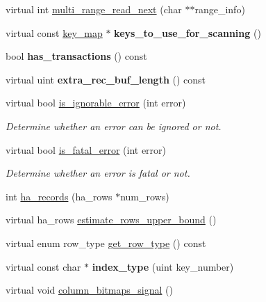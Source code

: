 \begin{DoxyCompactItemize}
\item 
virtual int \mbox{\hyperlink{classhandler_a3419071f3d4abf183dac95ef565adfff}{multi\+\_\+range\+\_\+read\+\_\+next}} (char $\ast$$\ast$range\+\_\+info)
\item 
\mbox{\label{classhandler_a29c43b5f1fb4c515d2c5842dcbc24fac}} 
virtual const \mbox{\hyperlink{classBitmap_3_0164_01_4}{key\+\_\+map}} $\ast$ {\bfseries keys\+\_\+to\+\_\+use\+\_\+for\+\_\+scanning} ()
\item 
\mbox{\label{classhandler_a08686bccb46c2be2cc92ff2f75ab9540}} 
bool {\bfseries has\+\_\+transactions} () const
\item 
\mbox{\label{classhandler_a27fd434bc44b88f4e47f44f02c877c91}} 
virtual uint {\bfseries extra\+\_\+rec\+\_\+buf\+\_\+length} () const
\item 
virtual bool \mbox{\hyperlink{classhandler_a39c5919d6a3f3098353f4517e2c81037}{is\+\_\+ignorable\+\_\+error}} (int error)
\begin{DoxyCompactList}\small\item\em Determine whether an error can be ignored or not. \end{DoxyCompactList}\item 
virtual bool \mbox{\hyperlink{classhandler_a37413b5d60b340ffe26a6713b65bab75}{is\+\_\+fatal\+\_\+error}} (int error)
\begin{DoxyCompactList}\small\item\em Determine whether an error is fatal or not. \end{DoxyCompactList}\item 
int \mbox{\hyperlink{classhandler_a9fe4a9e78c818aa2823c302f0fe65522}{ha\+\_\+records}} (ha\+\_\+rows $\ast$num\+\_\+rows)
\item 
virtual ha\+\_\+rows \mbox{\hyperlink{classhandler_ae59e9a1d36d852f4dd5dd00bff5f1ae4}{estimate\+\_\+rows\+\_\+upper\+\_\+bound}} ()
\item 
virtual enum row\+\_\+type \mbox{\hyperlink{classhandler_a163a360c0cd4575ae207553b8d5c918d}{get\+\_\+row\+\_\+type}} () const
\item 
\mbox{\label{classhandler_a1e51a7f02396ce5cef9cbe41a4a0a888}} 
virtual const char $\ast$ {\bfseries index\+\_\+type} (uint key\+\_\+number)
\item 
virtual void \mbox{\hyperlink{classhandler_a4de97045e5381007565fd2b0da235c07}{column\+\_\+bitmaps\+\_\+signal}} ()
$$
\end{DoxyCompactItemize}
